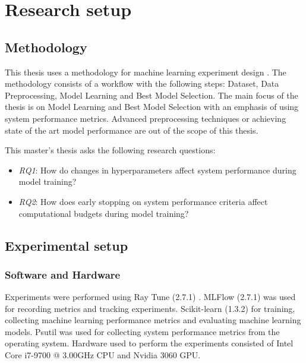 \chapter{Research setup}
\label{chap:methods}

\section{Methodology}

This thesis uses a methodology for machine learning experiment design \parencite{fernandez-lozanoMethodologyDesignExperiments2016}. The methodology consists of a workflow with the following steps: Dataset, Data Preprocessing, Model Learning and Best Model Selection. The main focus of the thesis is on Model Learning and Best Model Selection with an emphasis of using system performance metrics. Advanced preprocessing techniques or achieving state of the art model performance are out of the scope of this thesis.





This master's thesis asks the following research questions:
\begin{itemize}
    \item \emph{RQ1}: How do changes in hyperparameters affect system performance during model training?
    \item \emph{RQ2}: How does early stopping on system performance criteria affect computational budgets during model training?
          
\end{itemize}

\section{Experimental setup}

\subsection{Software and Hardware}

Experiments were performed using Ray Tune (2.7.1) \parencite{liawTuneResearchPlatform2018}. MLFlow (2.7.1) \parencite{chenDevelopmentsMLflowSystem2020} was used for recording metrics and tracking experiments. Scikit-learn (1.3.2) \parencite{pedregosaScikitlearnMachineLearning2011} for training, collecting machine learning performance metrics and evaluating machine learning models. Psutil \parencite{rodolaGiampaoloPsutil2023} was used for collecting system performance metrics from the operating system. Hardware used to perform the experiments consisted of Intel Core i7-9700 @ 3.00GHz CPU and Nvidia 3060 GPU.


